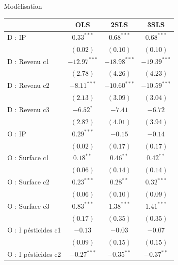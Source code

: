 \documentclass[11pt,ignorenonframetext,]{beamer}
\begin{document}
\begin{frame}{Modèlisation}
\protect\hypertarget{modelisation-1}{}

\tiny

\begin{table}[!htbp]
\begin{center}
\begin{tabular}{l c c c }
\hline
 & OLS & 2SLS & 3SLS \\
\hline
D : IP              & $0.33^{***}$   & $0.68^{***}$   & $0.68^{***}$   \\
                    & $(0.02)$       & $(0.10)$       & $(0.10)$       \\
D : Revenu c1       & $-12.97^{***}$ & $-18.98^{***}$ & $-19.39^{***}$ \\
                    & $(2.78)$       & $(4.26)$       & $(4.23)$       \\
D : Revenu c2       & $-8.11^{***}$  & $-10.60^{***}$ & $-10.59^{***}$ \\
                    & $(2.13)$       & $(3.09)$       & $(3.04)$       \\
D : Revenu c3       & $-6.52^{*}$    & $-7.41$        & $-6.72$        \\
                    & $(2.82)$       & $(4.01)$       & $(3.94)$       \\
O : IP              & $0.29^{***}$   & $-0.15$        & $-0.14$        \\
                    & $(0.02)$       & $(0.17)$       & $(0.17)$       \\
O : Surface c1      & $0.18^{**}$    & $0.46^{**}$    & $0.42^{**}$    \\
                    & $(0.06)$       & $(0.14)$       & $(0.14)$       \\
O : Surface c2      & $0.23^{***}$   & $0.28^{**}$    & $0.32^{***}$   \\
                    & $(0.06)$       & $(0.10)$       & $(0.09)$       \\
O : Surface c3      & $0.83^{***}$   & $1.38^{***}$   & $1.41^{***}$   \\
                    & $(0.17)$       & $(0.35)$       & $(0.35)$       \\
O : I pésticides c1 & $-0.13$        & $-0.03$        & $-0.07$        \\
                    & $(0.09)$       & $(0.15)$       & $(0.15)$       \\
O : I pésticides c2 & $-0.27^{***}$  & $-0.35^{**}$   & $-0.37^{**}$   \\

\end{tabular}
\end{center}
\end{table}
\end{frame}
\end{document}
